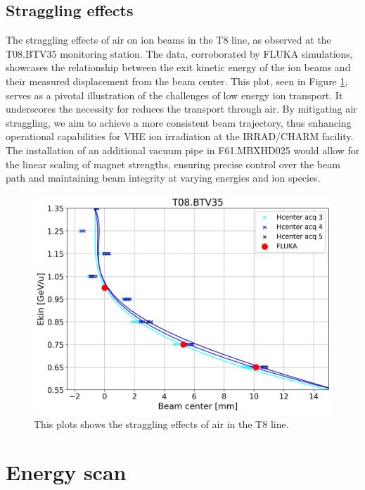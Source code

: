 \documentclass[a4paper,
               ]{jacow}
\begin{document}
\subsection{Straggling effects}

The straggling effects of air on ion beams in the T8 line, as observed at the T08.BTV35 monitoring station. The data, corroborated by FLUKA simulations, showcases the relationship between the exit kinetic energy of the ion beams and their measured displacement from the beam center. This plot, seen in Figure \ref{fig:straggling_effects}, serves as a pivotal illustration of the challenges of low energy ion transport. It underscores the necessity for reduces the transport through air. By mitigating air straggling, we aim to achieve a more consistent beam trajectory, thus enhancing operational capabilities for VHE ion irradiation at the IRRAD/CHARM facility. The installation of an additional vacuum pipe in F61.MBXHD025 would allow for the linear scaling of magnet strengths, ensuring precise control over the beam path and maintaining beam integrity at varying energies and ion species.
\begin{figure}[!htb]
   \centering
   \includegraphics*[width=1.0\columnwidth]{straggling_effects.png}
   \caption{This plots shows the straggling effects of air in the T8 line.}
   \label{fig:straggling_effects}
\end{figure}


\section{Energy scan}
\end{document}
